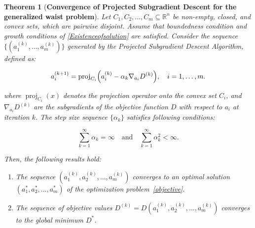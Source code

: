 \documentclass[12pt]{article}
\theoremstyle{plain}
\newtheorem{theorem}{Theorem}[section]
\theoremstyle{definition}
\begin{document}
\begin{theorem}[\textbf{Convergence of Projected Subgradient Descent for the generalized waist problem}]
	Let $C_1, C_2, \dots, C_m \subseteq\mathbb{R}^n$ be non-empty, closed, and convex sets, which are pairwise disjoint. Assume that boundedness condition and growth conditions of \ref{Existenceofsolution} are satisfied. 
	Consider the sequence \( \{(a_1^{(k)},\allowbreak\dots,\allowbreak a_m^{(k)})\} \)
	generated by the \textit{Projected Subgradient Descent Algorithm}, defined as:
	
	
	\begin{align}
		a_i^{(k+1)}
		= \operatorname{proj}_{C_i} \Bigl( a_i^{(k)}
		- \alpha_k \nabla_{a_i} D^{(k)} \Bigr),
		\quad i = 1, \dots, m.
		\label{eq:update_rules}
	\end{align}
	
	
	where \( \operatorname{proj}_{C_i}(x) \) denotes the projection operator onto the convex set \( C_i \), and \( \nabla_{a_i} D^{(k)} \) are the subgradients of the objective function \( D \)  with respect to $a_i$ at iteration \( k \). The step size sequence \( \{\alpha_k\} \) satisfies following conditions:
	
	\begin{equation} \label{stepsizecondition}
		\sum_{k=1}^\infty \alpha_k = \infty \quad \text{and} \quad \sum_{k=1}^\infty \alpha_k^2 < \infty.
	\end{equation}
	
	
	Then, the following results hold:
	\begin{enumerate}
		\item The sequence \((a_1^{(k)}\allowbreak, a_2^{(k)}\allowbreak, \dots\allowbreak, a_m^{(k)})\) converges to an optimal solution \((a_1^*\allowbreak, a_2^*\allowbreak, \dots\allowbreak, a_m^*)\) of the optimization problem~\eqref{objective}.
		\item The sequence of objective values \(D^{(k)} = D(a_1^{(k)}\allowbreak, a_2^{(k)}\allowbreak, \dots\allowbreak, a_m^{(k)})\) converges to the global minimum \(D^*\).
	\end{enumerate}
	
\end{theorem}
\end{document}
